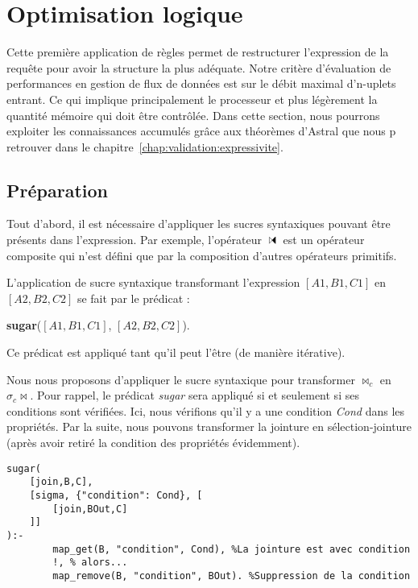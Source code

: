 \section{Optimisation logique}\label{sec:contrib:astronef:logique}
Cette première application de règles permet de restructurer l'expression de la requête pour avoir la structure la plus adéquate. Notre critère d'évaluation de performances en gestion de flux de données est sur le débit maximal d'n-uplets entrant. Ce qui implique principalement le processeur et plus légèrement la quantité mémoire qui doit être contrôlée. Dans cette section, nous pourrons exploiter les connaissances accumulés grâce aux théorèmes d'Astral que nous p retrouver dans le chapitre~\ref{chap:validation:expressivite}.
\subsection{Préparation}
Tout d'abord, il est nécessaire d'appliquer les sucres syntaxiques pouvant être présents dans l'expression. Par exemple, l'opérateur $\ssjoin$ est un opérateur composite qui n'est défini que par la composition d'autres opérateurs primitifs.

\begin{regle}
L'application de sucre syntaxique transformant l'expression $[A1,B1,C1]$ en $[A2,B2,C2]$ se fait par le prédicat :
\begin{center} \textbf{sugar}($[A1,B1,C1]$, $[A2,B2,C2]$).\end{center}
Ce prédicat est appliqué tant qu'il peut l'être (de manière itérative).
\end{regle}

\begin{example}
	Nous nous proposons d'appliquer le sucre syntaxique pour transformer $\Join_c$ en $\sigma_c \Join$. Pour rappel, le prédicat \textit{sugar} sera appliqué si et seulement si ses conditions sont vérifiées. Ici, nous vérifions qu'il y a une condition \textit{Cond} dans les propriétés. Par la suite, nous pouvons transformer la jointure en sélection-jointure (après avoir retiré la condition des propriétés évidemment).
	\begin{lstlisting}
sugar(
	[join,B,C], 
	[sigma, {"condition": Cond}, [
		[join,BOut,C]
	]]
):-
    	map_get(B, "condition", Cond), %La jointure est avec condition
    	!, % alors...
    	map_remove(B, "condition", BOut). %Suppression de la condition
	\end{lstlisting}
\end{example}

